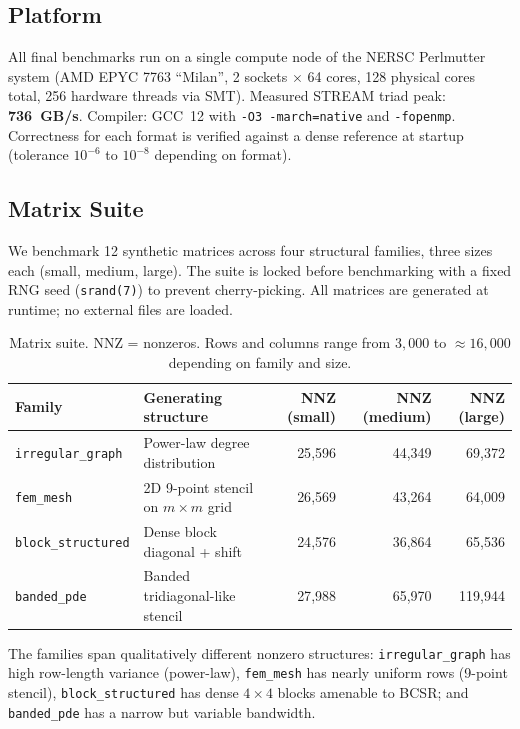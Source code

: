 \documentclass[11pt]{article}
\begin{document}
\subsection{Platform}

All final benchmarks run on a single compute node of the NERSC
Perlmutter system (AMD EPYC 7763 ``Milan'', 2 sockets $\times$ 64 cores,
128 physical cores total, 256 hardware threads via SMT).  Measured STREAM
triad peak: \textbf{736~GB/s}.  Compiler: GCC~12 with \texttt{-O3
-march=native} and \texttt{-fopenmp}.  Correctness for each format is
verified against a dense reference at startup (tolerance $10^{-6}$ to
$10^{-8}$ depending on format).

\subsection{Matrix Suite}

We benchmark 12 synthetic matrices across four structural families,
three sizes each (small, medium, large). The suite is locked before
benchmarking with a fixed RNG seed (\texttt{srand(7)}) to prevent
cherry-picking.  All matrices are generated at
runtime; no external files are loaded.

\begin{table}[h]
\centering
\small
\begin{tabular}{llrrr}
\toprule
Family & Generating structure & NNZ (small) & NNZ (medium) & NNZ (large) \\
\midrule
\texttt{irregular\_graph} & Power-law degree distribution & 25{,}596 & 44{,}349 & 69{,}372 \\
\texttt{fem\_mesh}        & 2D 9-point stencil on $m\times m$ grid & 26{,}569 & 43{,}264 & 64{,}009 \\
\texttt{block\_structured}& Dense block diagonal + shift  & 24{,}576 & 36{,}864 & 65{,}536 \\
\texttt{banded\_pde}      & Banded tridiagonal-like stencil       & 27{,}988 & 65{,}970 & 119{,}944 \\
\bottomrule
\end{tabular}
\caption{Matrix suite. NNZ = nonzeros. Rows and columns range from
$3{,}000$ to $\approx 16{,}000$ depending on family and size.}
\end{table}

The families span qualitatively different nonzero structures:
\texttt{irregular\_graph} has high row-length variance (power-law),
\texttt{fem\_mesh} has nearly uniform rows (9-point stencil),
\texttt{block\_structured} has dense $4{\times}4$ blocks amenable to BCSR;
and \texttt{banded\_pde} has a narrow but variable bandwidth.
\end{document}
